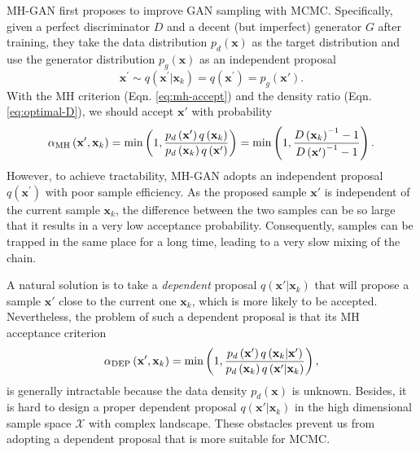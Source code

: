 \documentclass[runningheads]{llncs}
\newcommand{\bx}{\mathbf{x}}
\newcommand{\cX}{\mathcal{X}}
\newcommand{\<}{\left\langle}
\renewcommand{\>}{\right\rangle}
\begin{document}
MH-GAN \cite{turner2019metropolis} first proposes to improve GAN sampling with MCMC. Specifically, given a perfect discriminator $D$ and a decent (but imperfect) generator $G$ after training, they take the data distribution $p_d(\bx)$ as the target distribution and use the generator distribution $p_g(\bx)$ as an independent proposal
\begin{equation}
\mathbf{x}^{\prime} \sim q\left(\mathbf{x}^{\prime} | \mathbf{x}_{k}\right)=q\left(\mathbf{x}^{\prime}\right)=p_g(\bx').
\label{eq:independence-proposal}
\end{equation}
With the MH criterion (Eqn. \eqref{eq:mh-accept}) and the density ratio (Eqn. \eqref{eq:optimal-D}), we should accept $\bx'$
with probability
\begin{equation}
\alpha_{\rm MH}\left(\mathbf{x}^{\prime}, \mathbf{x}_{k}\right)=\min \left(1, \frac{p_d\left(\mathbf{x}^{\prime}\right) q\left(\mathbf{x}_{k}\right)}{p_d\left(\mathbf{x}_{k}\right) q\left(\mathbf{x}^{\prime}\right)}\right)=\min \left(1, \frac{D\left(\mathbf{x}_{k}\right)^{-1}-1}{D\left(\mathbf{x}^{\prime}\right)^{-1}-1}\right).
\label{eq:mhgan-alpha}
\end{equation}
However, to achieve tractability, MH-GAN adopts an independent proposal $q(\bx^\prime)$ with poor sample efficiency. As the proposed sample $\bx'$ is independent of the current sample $\bx_k$, the difference between the two samples can be so large that it results in a very low acceptance probability. Consequently, samples can be trapped in the same place for a long time, leading to a very slow mixing of the chain. 

A natural solution is to take a \textit{dependent} proposal $q(\bx'|\bx_k)$ that will propose a sample $\bx'$ close to the current one $\bx_k$, which is more likely to be accepted. 
Nevertheless, the problem of such a dependent proposal is that its MH acceptance criterion
\begin{equation}
    \alpha_{\rm DEP}\left(\mathbf{x}^{\prime}, \mathbf{x}_{k}\right)=\min \left(1, \frac{p_d\left(\mathbf{x}^{\prime}\right) q\left(\mathbf{x}_{k}|\bx'\right)}{p_d\left(\mathbf{x}_{k}\right) q\left(\mathbf{x}^{\prime}|\bx_k\right)}\right),
    \label{eq:dependent-proposal-acceptance}
\end{equation}
is generally intractable because the data density $p_d(\bx)$ is unknown. Besides, it is hard to design a proper dependent proposal $q(\bx'|\bx_k)$ in the high dimensional sample space $\cX$ with complex landscape. These obstacles prevent us from adopting a dependent proposal that is more suitable for MCMC.
\end{document}
